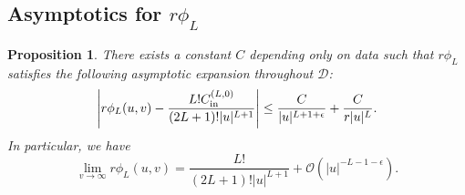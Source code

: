 \documentclass[11pt,english]{article}
\numberwithin{equation}{section}
\theoremstyle{remark}
\theoremstyle{plain}
\newtheorem{prop}{Proposition}[section]
\theoremstyle{remark}
\renewcommand{\(}{\left(}
\renewcommand{\)}{\right)}
\begin{document}
\subsection{Asymptotics for \texorpdfstring{$r\phi_L$}{r phiL}}
\begin{prop}\label{propp}
There exists a constant $C$ depending only on data such that $r\phi_L$ satisfies the following asymptotic expansion throughout $\mathcal{D}$:
\begin{equation}\label{eq:gnl:asy.phi.r}
\left|r\phi_L(u,v)-\frac{L!C_{\mathrm{in}}^{(L,0)}}{(2L+1)!|u|^{L+1}}\right|\leq\frac{C}{|u|^{L+1+\epsilon}}+\frac{C}{r|u|^L}.
\end{equation}
In particular, we have
\begin{equation}\label{eq:gnl:asy.phi.u}
\lim_{v\to\infty}r\phi_L(u,v)=\frac{L!}{(2L+1)!|u|^{L+1}}+\mathcal{O}(|u|^{-L-1-\epsilon}).
\end{equation}
\end{prop}
\end{document}

